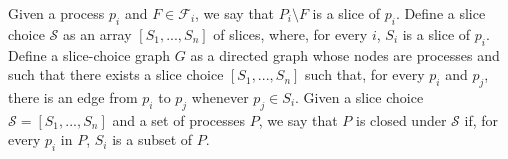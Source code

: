 \documentclass[11pt]{article}
\begin{document}
Given a process $p_i$ and $F\in \mathcal{F}_i$, we say that $P_i\setminus F$ is a slice of $p_i$.
Define a slice choice $\mathcal{S}$ as an array $\left[S_1,...,S_n\right]$ of slices, where, for every $i$, $S_i$ is a slice of $p_i$.
Define a slice-choice graph $G$ as a directed graph whose nodes are processes and such that there exists a slice choice $\left[S_1,...,S_n\right]$ such that, for every $p_i$ and $p_j$, there is an edge from $p_i$ to $p_j$ whenever $p_j\in S_i$.
Given a slice choice $\mathcal{S}=\left[S_1,...,S_n\right]$ and a set of processes $P$, we say that $P$ is closed under $\mathcal{S}$ if, for every $p_i$ in $P$, $S_i$ is a subset of $P$.





\end{document}
